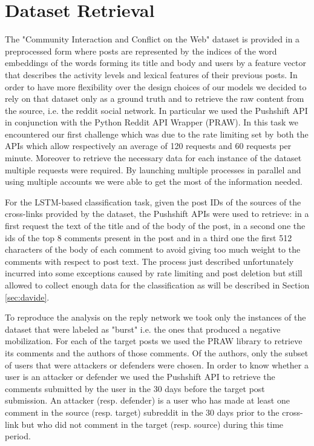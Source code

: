 \documentclass{article}
\begin{document}
\section{Dataset Retrieval}
\label{sec:retrieval}

The "Community Interaction and Conflict on the Web" dataset is provided in a
preprocessed form where posts are represented by the indices of the word
embeddings of the words forming its title and body and users by a feature vector
that describes the activity levels and lexical features of their previous posts.
In order to have more flexibility over the design choices of our models we
decided to rely on that dataset only as a ground truth and to retrieve the raw
content from the source, i.e. the reddit social network. In particular we used
the Pushshift API in conjunction with the Python Reddit API Wrapper (PRAW). In
this task we encountered our first challenge which was due to the rate limiting
set by both the APIs which allow respectively an average of 120 requests and
60 requests per minute. Moreover to retrieve the necessary data for each
instance of the dataset multiple requests were required. By launching multiple
processes in parallel and using multiple accounts we were able to get the
most of the information needed.

For the LSTM-based classification task, given the post IDs of the sources of
the cross-links provided by the dataset, the Pushshift APIs were used to
retrieve: in a first request the text of the title and of the body of the post,
in a second one the ids of the top 8 comments present in the post and in a third
one the first 512 characters of the body of each comment to avoid giving too
much weight to the comments with respect to post text. The process just
described unfortunately incurred into some exceptions caused by rate limiting
and post deletion but still allowed to collect enough data for the
classification as will be described in Section \ref{sec:davide}.

To reproduce the analysis on the reply network we took only
the instances of the dataset that were labeled as "burst" i.e. the ones that
produced a negative mobilization. For each of the target posts we used the
PRAW library to retrieve its comments and the authors of those comments. Of the
authors, only the subset of users that were attackers or defenders were chosen.
In order to know whether a user is an attacker or defender we used the Pushshift
API to retrieve the comments submitted by the user in the 30 days before the
target post submission. An attacker (resp. defender) is a user who has made at
least one comment in the source (resp. target) subreddit in the 30 days prior to the
cross-link but who did not comment in the target (resp. source) during this time
period.
\end{document}
